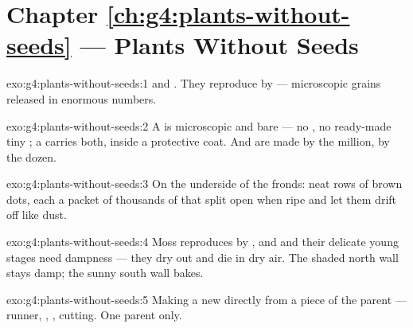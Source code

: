 \section*{Chapter \ref{ch:g4:plants-without-seeds} --- Plants Without Seeds}

\begin{solution}{exo:g4:plants-without-seeds:1}
 and . They reproduce by  --- microscopic
grains released in enormous numbers.
\end{solution}

\begin{solution}{exo:g4:plants-without-seeds:2}
A  is microscopic and bare --- no , no
ready-made tiny ; a  carries both, inside a protective
coat. And  are made by the million,  by the dozen.
\end{solution}

\begin{solution}{exo:g4:plants-without-seeds:3}
On the underside of the fronds: neat rows of brown dots, each a
packet of thousands of  that split open when ripe and let
them drift off like dust.
\end{solution}

\begin{solution}{exo:g4:plants-without-seeds:4}
Moss reproduces by , and  and their delicate young
stages need dampness --- they dry out and die in dry air. The
shaded north wall stays damp; the sunny south wall bakes.
\end{solution}

\begin{solution}{exo:g4:plants-without-seeds:5}
Making a new  directly from a piece of the parent 
--- runner, , , cutting. One parent only.
\end{solution}

